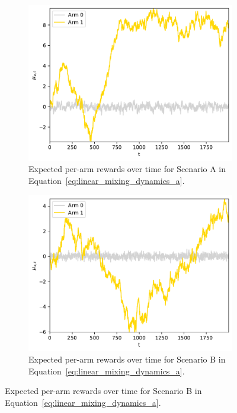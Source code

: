 \begin{figure}[!h]
	\centering
	\begin{subfigure}[b]{0.45\textwidth}
		\includegraphics[width=\textwidth]{./fods_figs/dynamic/linearGaussian/dynamics_a}
		\caption{Expected per-arm rewards over time for Scenario A in Equation~\eqref{eq:linear_mixing_dynamics_a}.}
		\label{fig:linear_mixing_dynamics_a_gaussian}
	\end{subfigure}\qquad
	\begin{subfigure}[b]{0.45\textwidth}
		\includegraphics[width=\textwidth]{./fods_figs/dynamic/linearGaussian/dynamics_b}
		\caption{Expected per-arm rewards over time for Scenario B in Equation~\eqref{eq:linear_mixing_dynamics_a}.}
		\label{fig:linear_mixing_dynamics_b_gaussian}
	\end{subfigure}
	

\end{figure}
